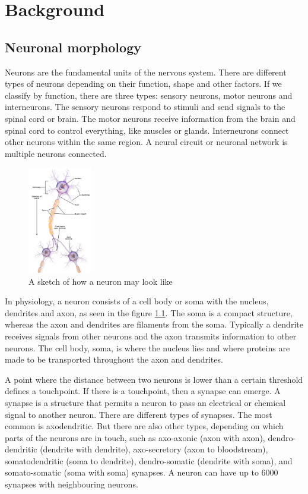 \chapter{Background}
\label{chapter:background}

\section{Neuronal morphology}
Neurons are the fundamental units of the nervous system.  There are different types of neurons depending on their function, shape and other factors. If we classify by function, there are three types: sensory neurons, motor neurons and interneurons. The sensory neurons respond to stimuli and send signals to the spinal cord or brain. The motor neurons receive information from the brain and spinal cord to control everything, like muscles or glands. Interneurons connect other neurons within the same region. A neural circuit or neuronal network is multiple neurons connected.
\begin{figure}
    \centering
    \includegraphics[width=0.25\textwidth]{figures/NeuronParts.png}
    \caption{A sketch of how a neuron may look like \cite{wiki:interneurons}}
    \label{fig:NeuronParts}
\end{figure}

In physiology, a neuron consists of a cell body or soma with the nucleus, dendrites and axon, as seen in the figure \ref{fig:NeuronParts}. The soma is a compact structure, whereas the axon and dendrites are filaments from the soma. Typically a dendrite receives signals from other neurons and the axon transmits information to other neurons. The cell body, soma, is where the nucleus lies and where proteins are made to be transported throughout the axon and dendrites.

A point where the distance between two neurons is lower than a certain threshold defines a touchpoint. If there is a touchpoint, then a synapse can emerge. A synapse is a structure that permits a neuron to pass an electrical or chemical signal to another neuron. There are different types of synapses. The most common is axodendritic. But there are also other types, depending on which parts of the neurons are in touch, such as axo-axonic (axon with axon), dendro-dendritic (dendrite with dendrite), axo-secretory (axon to bloodstream), somatodendritic (soma to dendrite), dendro-somatic (dendrite with soma), and somato-somatic (soma with soma) synapses. A neuron can have up to 6000 synapses with neighbouring neurons\cite{Sherwood2020}.

